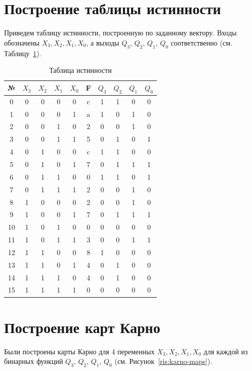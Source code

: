 \section{Построение таблицы истинности}
Приведем таблицу истинности, построенную по заданному вектору. Входы обозначены $X_3, X_2, X_1, X_0$, а выходы $Q_3$,  $Q_2$, $Q_1$,  $Q_0$ соответственно (см. Таблицу~\ref{tab:func-table}).

\begin{table}[htbp]
	\small
	\centering
	\caption{Таблица истинности}
		\begin{tabular}{|c||c|c|c|c||c||c|c|c|c|}
			\hline
			№ & $X_3$ & $X_2$ & $X_1$ & $X_0$ & F & $Q_3$ & $Q_2$ & $Q_1$ & $Q_0$ \\ \hline \hline
			0 & 0 & 0 & 0 & 0 & c & 1 & 1 & 0 & 0 \\ \hline
			1 & 0 & 0 & 0 & 1 & a & 1 & 0 & 1 & 0 \\ \hline
			2 & 0 & 0 & 1 & 0 & 2 & 0 & 0 & 1 & 0 \\ \hline
			3 & 0 & 0 & 1 & 1 & 5 & 0 & 1 & 0 & 1 \\ \hline
			4 & 0 & 1 & 0 & 0 & c & 1 & 1 & 0 & 0 \\ \hline
			5 & 0 & 1 & 0 & 1 & 7 & 0 & 1 & 1 & 1 \\ \hline
			6 & 0 & 1 & 1 & 0 & 0 & 1 & 1 & 0 & 1 \\ \hline
			7 & 0 & 1 & 1 & 1 & 2 & 0 & 0 & 1 & 0 \\ \hline
			8 & 1 & 0 & 0 & 0 & 2 & 0 & 0 & 1 & 0 \\ \hline
			9 & 1 & 0 & 0 & 1 & 7 & 0 & 1 & 1 & 1 \\ \hline
			10 & 1 & 0 & 1 & 0 & 0 & 0 & 0 & 0 & 0 \\ \hline
			11 & 1 & 0 & 1 & 1 & 3 & 0 & 0 & 1 & 1 \\ \hline
			12 & 1 & 1 & 0 & 0 & 8 & 1 & 0 & 0 & 0 \\ \hline
			13 & 1 & 1 & 0 & 1 & 4 & 0 & 1 & 0 & 0 \\ \hline
			14 & 1 & 1 & 1 & 0 & 4 & 0 & 1 & 0 & 0 \\ \hline
			15 & 1 & 1 & 1 & 1 & 0 & 0 & 0 & 0 & 0 \\ \hline
		\end{tabular}
	\label{tab:func-table}
\end{table}

\section{Построение карт Карно}
Были построены карты Карно для 4 переменных $X_3, X_2, X_1, X_0$ для каждой из бинарных функций $Q_3$,  $Q_2$, $Q_1$,  $Q_0$ (см. Рисунок~\ref{ris:karno-maps}).

